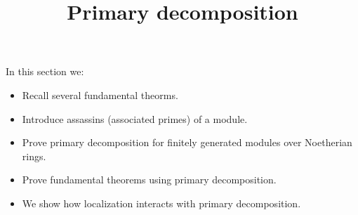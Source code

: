\documentclass{ximera}
\title{Primary decomposition}
\begin{document}
\begin{abstract}
\end{abstract}

\maketitle

In this section we:

\begin{itemize}
\item Recall several fundamental theorms.
\item Introduce assassins (associated primes) of a module.
\item Prove primary decomposition for finitely generated modules over
  Noetherian rings.
\item Prove fundamental theorems using primary decomposition.
\item We show how localization interacts with primary decomposition.
\end{itemize}
\end{document}
